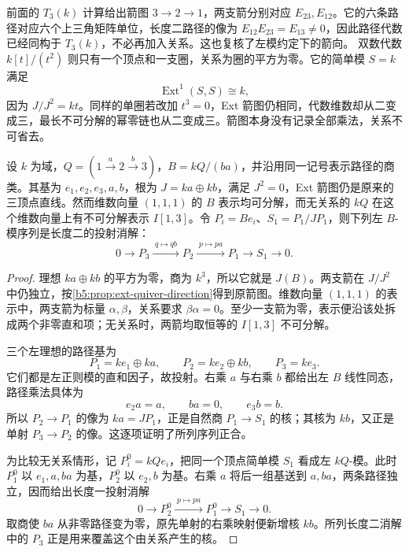 前面的 \(T_3(k)\) 计算给出箭图 \(3\to2\to1\)，两支箭分别对应 \(E_{23},E_{12}\)。它的六条路径对应六个上三角矩阵单位，长度二路径的像为 \(E_{12}E_{23}=E_{13}\ne0\)，因此路径代数已经同构于 \(T_3(k)\)，不必再加入关系。这也复核了左模约定下的箭向。
\ProseParagraphBreak
双数代数 \(k[t]/(t^2)\) 则只有一个顶点和一支圈，关系为圈的平方为零。它的简单模 \(S=k\) 满足
\[
	\operatorname{Ext}^1(S,S)\cong k,
\]
因为 \(J/J^2=kt\)。同样的单圈若改加 \(t^3=0\)，Ext 箭图仍相同，代数维数却从二变成三，最长不可分解的幂零链也从二变成三。箭图本身没有记录全部乘法，关系不可省去。
\begin{example}\label{b5:exm:zero-composition-bound-quiver}
	设 \(k\) 为域，\(Q=(1\xrightarrow{a}2\xrightarrow{b}3)\)，\(B=kQ/(ba)\)，并沿用同一记号表示路径的商类。其基为 \(e_1,e_2,e_3,a,b\)，根为 \(J=ka\oplus kb\)，满足 \(J^2=0\)，Ext 箭图仍是原来的三顶点直线。然而维数向量 \((1,1,1)\) 的 \(B\) 表示均可分解，而无关系的 \(kQ\) 在这个维数向量上有不可分解表示 \(I[1,3]\)。令 \(P_i=Be_i\)、\(S_1=P_1/JP_1\)，则下列左 \(B\)-模序列是长度二的投射消解：
	\[
		0\longrightarrow P_3\xrightarrow{\;q\mapsto qb\;}P_2 \xrightarrow{\;p\mapsto pa\;}P_1 \longrightarrow S_1\longrightarrow0.
	\]
\end{example}
\begin{proof}
	理想 \(ka\oplus kb\) 的平方为零，商为 \(k^3\)，所以它就是 \(J(B)\)。两支箭在 \(J/J^2\) 中仍独立，按\cref{b5:prop:ext-quiver-direction}得到原箭图。维数向量 \((1,1,1)\) 的表示中，两支箭为标量 \(\alpha,\beta\)，关系要求 \(\beta\alpha=0\)。至少一支箭为零，表示便沿该处拆成两个非零直和项；无关系时，两箭均取恒等的 \(I[1,3]\) 不可分解。

	三个左理想的路径基为
	\[
		P_1=ke_1\oplus ka,\qquad P_2=ke_2\oplus kb,\qquad P_3=ke_3.
	\]
	它们都是左正则模的直和因子，故投射。右乘 \(a\) 与右乘 \(b\) 都给出左 \(B\) 线性同态，路径乘法具体为
	\[
		e_2a=a,\qquad ba=0,\qquad e_3b=b.
	\]
	所以 \(P_2\to P_1\) 的像为 \(ka=JP_1\)，正是自然商 \(P_1\to S_1\) 的核；其核为 \(kb\)，又正是单射 \(P_3\to P_2\) 的像。这逐项证明了所列序列正合。

	为比较无关系情形，记 \(P_i^0=kQe_i\)，把同一个顶点简单模 \(S_1\) 看成左 \(kQ\)-模。此时 \(P_1^0\) 以 \(e_1,a,ba\) 为基，\(P_2^0\) 以 \(e_2,b\) 为基。右乘 \(a\) 将后一组基送到 \(a,ba\)，两条路径独立，因而给出长度一投射消解
	\[
		0\longrightarrow P_2^0\xrightarrow{\;p\mapsto pa\;}P_1^0 \longrightarrow S_1\longrightarrow0.
	\]
	取商使 \(ba\) 从非零路径变为零，原先单射的右乘映射便新增核 \(kb\)。所列长度二消解中的 \(P_3\) 正是用来覆盖这个由关系产生的核。
\end{proof}

